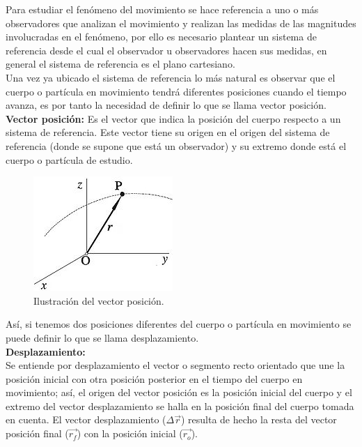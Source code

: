 \documentclass[a5paper,pagesize,10pt,bibtotoc,pointlessnumbers,
normalheadings,DIV=9,fleqn,x11names,table,twoside=false]{scrbook}
\begin{document}
Para estudiar el fenómeno del movimiento se hace referencia a uno o más observadores que analizan el movimiento y realizan las 
medidas de las magnitudes involucradas en el fenómeno, por ello es necesario plantear un sistema de referencia desde el cual el 
observador u observadores hacen sus medidas, en general el sistema de referencia es el plano cartesiano.\\

Una vez ya ubicado el sistema de referencia lo más natural es observar que el cuerpo o partícula en movimiento tendrá diferentes 
posiciones cuando el tiempo avanza, es por tanto la necesidad de definir lo que se llama vector posición.\\ 

\textbf{Vector posición:} Es el vector que indica la posición del cuerpo respecto a un sistema de referencia. Este vector tiene 
su origen en el origen del sistema de referencia (donde se supone que está un observador) y su extremo donde está el cuerpo o 
partícula de estudio.

\begin{figure}[ht]
 \centering
 \includegraphics[scale=0.6]{images/posicion.jpg}
 \caption{Ilustración del vector posición.}
\end{figure}

Así, si tenemos dos posiciones diferentes del cuerpo o partícula en movimiento se puede definir lo que se llama desplazamiento.\\

\textbf{Desplazamiento:}\\

Se entiende por desplazamiento el vector o segmento recto orientado que une la posición inicial con otra posición posterior en el 
tiempo del cuerpo en movimiento; así, el origen del vector posición es la posición inicial del cuerpo y el extremo del vector 
desplazamiento se halla en la posición final del cuerpo tomada en cuenta. El vector desplazamiento ($\Delta \vec{r}$) resulta de 
hecho la resta del vector posición final ($\vec{r_f}$) con la posición inicial ($\vec{r_o}$).
\end{document}
